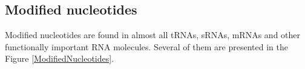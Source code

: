 \documentclass[12pt]{article}
\begin{document}
\subsection{Modified nucleotides}
Modified nucleotides are found in almost all tRNAs, sRNAs, mRNAs and other functionally important RNA molecules. Several of them are presented in the Figure \ref{ModifiedNucleotides}. 
\begin{figure}[h!]
\centering
\begin{center}

\end{center}
\end{figure}
\end{document}
